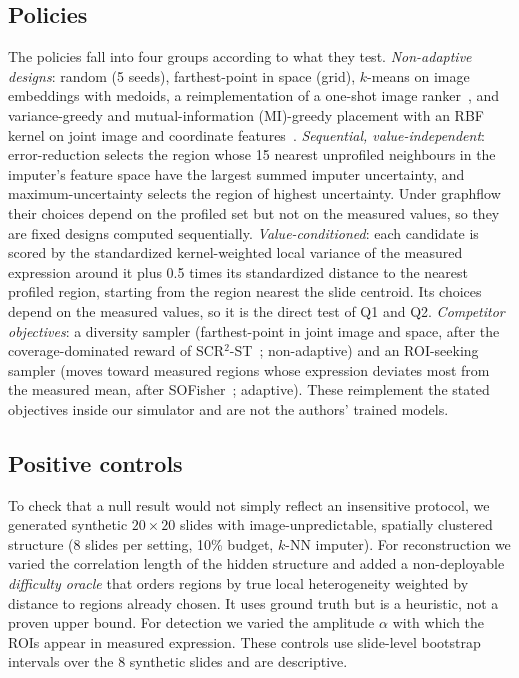 \documentclass{article}
\begin{document}
\subsection{Policies}
The policies fall into four groups according to what they test.
\emph{Non-adaptive designs}: random (5 seeds), farthest-point in space (grid), $k$-means on image embeddings
with medoids, a reimplementation of a one-shot image ranker~\citep{spatialfinder2026}, and variance-greedy and
mutual-information (MI)-greedy placement with an RBF kernel on joint image and coordinate
features~\citep{krause2008near}.
\emph{Sequential, value-independent}: error-reduction selects the region whose 15 nearest unprofiled
neighbours in the imputer's feature space have the largest summed imputer uncertainty, and maximum-uncertainty
selects the region of highest uncertainty. Under graphflow their choices depend on the profiled set but not
on the measured values, so they are fixed designs computed sequentially.
\emph{Value-conditioned}: each candidate is scored by the standardized kernel-weighted local variance of the
measured expression around it plus 0.5 times its standardized distance to the nearest profiled region,
starting from the region nearest the slide centroid. Its choices depend on the measured values, so it is the
direct test of Q1 and Q2.
\emph{Competitor objectives}: a diversity sampler (farthest-point in joint image and space, after the
coverage-dominated reward of SCR$^2$-ST~\citep{zhu2025scr2st}; non-adaptive) and an ROI-seeking sampler (moves
toward measured regions whose expression deviates most from the measured mean, after
SOFisher~\citep{li2026sofisher}; adaptive). These reimplement the stated objectives inside our simulator and
are not the authors' trained models.

\subsection{Positive controls}
To check that a null result would not simply reflect an insensitive protocol, we generated synthetic
$20\times20$ slides with image-unpredictable, spatially clustered structure (8 slides per setting, 10\% budget,
$k$-NN imputer). For reconstruction we varied the correlation length of the hidden structure and added a
non-deployable \emph{difficulty oracle} that orders regions by true local heterogeneity weighted by distance to
regions already chosen. It uses ground truth but is a heuristic, not a proven upper bound. For detection we
varied the amplitude $\alpha$ with which the ROIs appear in measured expression. These controls use slide-level
bootstrap intervals over the 8 synthetic slides and are descriptive.
\end{document}
